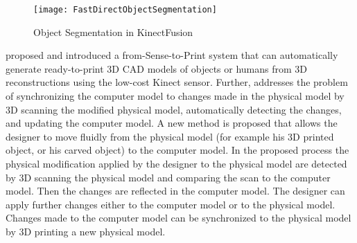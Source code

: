 %
\begin{figure}[t]
\centering
\texttt{[image: FastDirectObjectSegmentation]}
\caption{Object Segmentation in KinectFusion \cite{KinectFusionIzadi_2011}}
\label{FastDirectObjectSegmentation}
\end{figure}%
%
\cite{3DPrintingFrom3DSensing13} proposed and introduced a from-Sense-to-Print system that can automatically generate ready-to-print 3D CAD models of objects or humans from 3D reconstructions using the low-cost Kinect sensor. Further, \cite{3DModelingForPrinting15} addresses the problem of synchronizing the computer model to changes made in the physical model by 3D scanning the modified physical model, automatically detecting the changes, and updating the computer model. A new method is proposed that allows the designer to move fluidly from the physical model (for example his 3D printed object, or his carved object) to the computer model. In the proposed process the physical modification applied by the designer to the physical model are detected by 3D scanning the physical model and comparing the scan to the computer model. Then the changes are reflected in the computer model. The designer can apply further changes either to the computer model or to the physical model. Changes made to the computer model can be synchronized to the physical model by 3D printing a new physical model.
%
%

